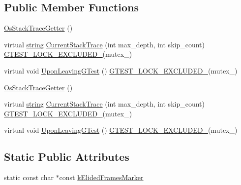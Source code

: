 \subsection*{Public Member Functions}
\begin{DoxyCompactItemize}
\item 
\hyperlink{classtesting_1_1internal_1_1_os_stack_trace_getter_aa40b3120c0ae4ec640de8b577ab7da17}{Os\-Stack\-Trace\-Getter} ()
\item 
virtual \hyperlink{namespacetesting_1_1internal_a5ca8a348395a6145775c1a2334e21889}{string} \hyperlink{classtesting_1_1internal_1_1_os_stack_trace_getter_afe0f7539f1a325eec1adf0625bbdfbd7}{Current\-Stack\-Trace} (int max\-\_\-depth, int skip\-\_\-count) \hyperlink{gtest-port_8h_a69abff5a4efdd07bd5faebe3dd318d06}{G\-T\-E\-S\-T\-\_\-\-L\-O\-C\-K\-\_\-\-E\-X\-C\-L\-U\-D\-E\-D\-\_\-}(mutex\-\_\-)
\item 
virtual void \hyperlink{classtesting_1_1internal_1_1_os_stack_trace_getter_abdfefeba8ffb0f1031491e4bd1a7fad9}{Upon\-Leaving\-G\-Test} () \hyperlink{gtest-port_8h_a69abff5a4efdd07bd5faebe3dd318d06}{G\-T\-E\-S\-T\-\_\-\-L\-O\-C\-K\-\_\-\-E\-X\-C\-L\-U\-D\-E\-D\-\_\-}(mutex\-\_\-)
\item 
\hyperlink{classtesting_1_1internal_1_1_os_stack_trace_getter_aa40b3120c0ae4ec640de8b577ab7da17}{Os\-Stack\-Trace\-Getter} ()
\item 
virtual \hyperlink{namespacetesting_1_1internal_a5ca8a348395a6145775c1a2334e21889}{string} \hyperlink{classtesting_1_1internal_1_1_os_stack_trace_getter_afa3559076b2f91688ded60fa30b8de39}{Current\-Stack\-Trace} (int max\-\_\-depth, int skip\-\_\-count) \hyperlink{gtest-port_8h_a69abff5a4efdd07bd5faebe3dd318d06}{G\-T\-E\-S\-T\-\_\-\-L\-O\-C\-K\-\_\-\-E\-X\-C\-L\-U\-D\-E\-D\-\_\-}(mutex\-\_\-)
\item 
virtual void \hyperlink{classtesting_1_1internal_1_1_os_stack_trace_getter_af5ac172386d7454279c9e8fb6d756a61}{Upon\-Leaving\-G\-Test} () \hyperlink{gtest-port_8h_a69abff5a4efdd07bd5faebe3dd318d06}{G\-T\-E\-S\-T\-\_\-\-L\-O\-C\-K\-\_\-\-E\-X\-C\-L\-U\-D\-E\-D\-\_\-}(mutex\-\_\-)
\end{DoxyCompactItemize}
\subsection*{Static Public Attributes}
\begin{DoxyCompactItemize}
\item 
static const char $\ast$const \hyperlink{classtesting_1_1internal_1_1_os_stack_trace_getter_aa736c26a4ba2b59a7572e7f44bfe269e}{k\-Elided\-Frames\-Marker}
\end{DoxyCompactItemize}


